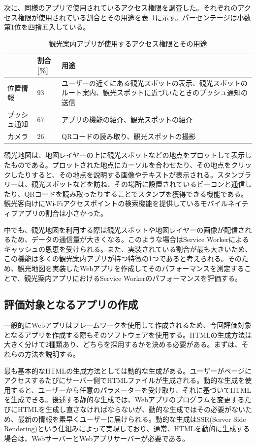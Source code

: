 次に、同様のアプリで使用されているアクセス権限を調査した。それぞれのアクセス権限が使用されている割合とその用途を表~\ref{table:観光案内アプリが使用するアクセス権限とその用途}に示す。パーセンテージは小数第1位を四捨五入している。

\begin{table}
  \caption{観光案内アプリが使用するアクセス権限とその用途}
  \label{table:観光案内アプリが使用するアクセス権限とその用途}
  \centering
  \begin{tabular}{|p{10em}|p{5em}|p{15em}|}
    \hline
    & 割合[\%] & 用途 \\ \hline
    位置情報 & 93 & ユーザーの近くにある観光スポットの表示、観光スポットのルート案内、観光スポットに近づいたときのプッシュ通知の送信 \\ \hline
    プッシュ通知 & 67 & アプリの機能の紹介、観光スポットの紹介 \\ \hline
    カメラ & 26 & QRコードの読み取り、観光スポットの撮影 \\ \hline
  \end{tabular}
\end{table}
観光地図は、地図レイヤーの上に観光スポットなどの地点をプロットして表示したものである。プロットされた地点にカーソルを合わせたり、その地点をクリックしたりすると、その地点を説明する画像やテキストが表示される。スタンプラリーは、観光スポットなどを訪ね、その場所に設置されているビーコンと通信したり、QRコードを読み取ったりすることでスタンプを獲得できる機能である。観光客向けにWi-Fiアクセスポイントの検索機能を提供しているモバイルネイティブアプリの割合は小さかった。

中でも、観光地図を利用する際は観光スポットや地図レイヤーの画像が配信されるため、データの通信量が大きくなる。このような場合はService Workerによるキャッシュの恩恵を受けられる。また、実装されている割合が最も大きいため、この機能は多くの観光案内アプリが持つ特徴の1つであると考えられる。そのため、観光地図を実装したWebアプリを作成してそのパフォーマンスを測定することで、観光案内アプリにおけるService Workerのパフォーマンスを評価する。
\subsection{評価対象となるアプリの作成}
\label{subsubsection:評価対象となるアプリの作成}
一般的にWebアプリはフレームワークを使用して作成されるため、今回評価対象となるアプリを作成する際もそのソフトウェアを使用する。HTMLの生成方法は大きく分けて2種類あり、どちらを採用するかを決める必要がある。まずは、それらの方法を説明する。

最も基本的なHTMLの生成方法としては動的な生成がある。ユーザーがページにアクセスするたびにサーバー側でHTMLファイルが生成される。動的な生成を使用すると、ユーザーから任意のパラメーターを受け取り、それに基づいてHTMLを生成できる。後述する静的な生成では、Webアプリのプログラムを変更するたびにHTMLを生成し直さなければならないが、動的な生成ではその必要がないため、最新の情報を素早くユーザーに届けられる。動的な生成はSSR(Server Side Rendering)という仕組みによって実現しており、通常、HTMLを動的に生成する場合は、WebサーバーとWebアプリサーバーが必要である。

